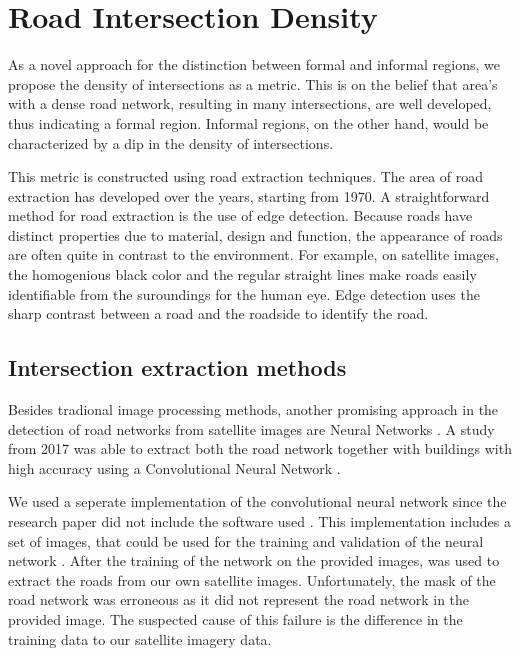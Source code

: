 \section{Road Intersection Density}

%

As a novel approach for the distinction between formal and informal regions, we
propose the density of intersections as a metric. This is on the belief that
area's with a dense road network, resulting in many intersections, are well
developed, thus indicating a formal region. Informal regions, on the other
hand, would be characterized by a dip in the density of intersections.  

This metric is constructed using road extraction techniques. The area of road
extraction has developed over the years, starting from 1970. A straightforward
method for road extraction is the use of edge detection. Because roads have
distinct properties due to material, design and function, the appearance of
roads are often quite in contrast to the environment. For example, on satellite
images, the homogenious black color and the regular straight lines make
roads easily identifiable from the suroundings for the human eye. Edge
detection uses the sharp contrast between a road and the roadside to identify
the road.


\subsection{Intersection extraction methods}

Besides tradional image processing methods, another promising approach in the
detection of road networks from satellite images are Neural Networks
\cite{mangala2011extraction} \cite{mokhtarzade2007road}. A study from 2017 was
able to extract both the road network together with buildings with high
accuracy using a Convolutional Neural Network \cite{alshehhi2017simultaneous}.

We used a seperate implementation of the convolutional neural network since the
research paper did not include the software used \cite{airs}. This
implementation includes a set of images, that could be used for the training
and validation of the neural network \cite{MnihThesis}. After the training of
the network on the provided images, was used to extract the roads from our own
satellite images.  Unfortunately, the mask of the road network was erroneous as
it did not represent the road network in the provided image. The suspected
cause of this failure is the difference in the training data to our satellite
imagery data.


